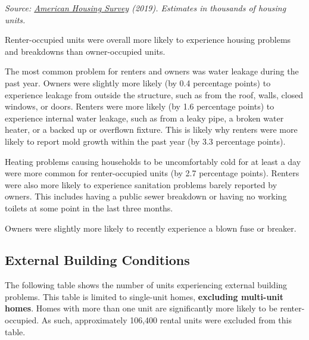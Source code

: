 \documentclass[
  openany]{book}
\begin{document}
\emph{Source: \href{https://www.census.gov/newsroom/press-releases/2020/2019-american-housing-survey.html}{American Housing Survey} (2019). Estimates in thousands of housing units.}

Renter-occupied units were overall more likely to experience housing problems and breakdowns than owner-occupied units.

The most common problem for renters and owners was water leakage during the past year. Owners were slightly more likely (by 0.4 percentage points) to experience leakage from outside the structure, such as from the roof, walls, closed windows, or doors. Renters were more likely (by 1.6 percentage points) to experience internal water leakage, such as from a leaky pipe, a broken water heater, or a backed up or overflown fixture. This is likely why renters were more likely to report mold growth within the past year (by 3.3 percentage points).

Heating problems causing households to be uncomfortably cold for at least a day were more common for renter-occupied units (by 2.7 percentage points). Renters were also more likely to experience sanitation problems barely reported by owners. This includes having a public sewer breakdown or having no working toilets at some point in the last three months.

Owners were slightly more likely to recently experience a blown fuse or breaker.

\hypertarget{external-building-conditions}{%
\subsection{External Building Conditions}\label{external-building-conditions}}

The following table shows the number of units experiencing external building problems. This table is limited to single-unit homes, \textbf{excluding multi-unit homes}. Homes with more than one unit are significantly more likely to be renter-occupied. As such, approximately 106,400 rental units were excluded from this table.
\end{document}
